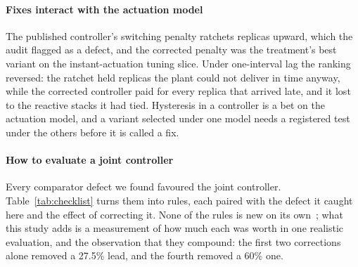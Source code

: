 \paragraph{Fixes interact with the actuation model}
The published controller's switching penalty ratchets replicas upward, which
the audit flagged as a defect, and the corrected penalty was the treatment's
best variant on the instant-actuation tuning slice. Under one-interval lag
the ranking reversed: the ratchet held replicas the plant could not deliver
in time anyway, while the corrected controller paid for every replica that
arrived late, and it lost to the reactive stacks it had tied. Hysteresis in a
controller is a bet on the actuation model, and a variant selected under one
model needs a registered test under the others before it is called a fix.

\paragraph{How to evaluate a joint controller}
Every comparator defect we found favoured the joint controller.
Table~\ref{tab:checklist} turns them into rules, each paired with the
defect it caught here and the effect of correcting it. None of the rules is
new on its own~\cite{chameleon,hoefler2015}; what this study adds is a
measurement of how much each was worth in one realistic evaluation, and
the observation that they compound: the first two corrections alone
removed a 27.5\% lead, and the fourth removed a 60\% one.

